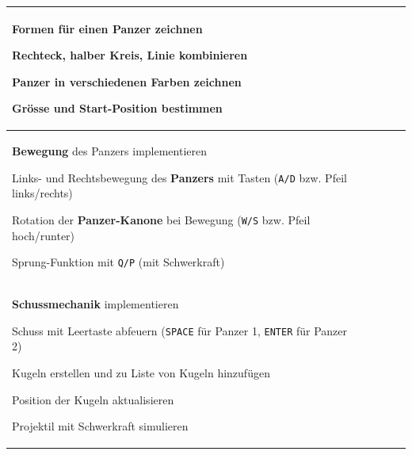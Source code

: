 \begin{landscape}
\begin{longtable}{p{11cm}|p{3cm}|p{3cm}|p{4cm}|p{4cm}}
        \begin{todolist}
            \item \textbf{Formen} für einen Panzer zeichnen
            \begin{todolist}
                \item Rechteck, halber Kreis, Linie kombinieren
                \item Panzer in verschiedenen Farben zeichnen
                \item Grösse und Start-Position bestimmen
            \end{todolist}
        \end{todolist}            &                                        &                                                            &                          &                                                            \\
        \hline
        \begin{todolist}
            \item \textbf{Bewegung} des Panzers implementieren
            \begin{todolist}
                \item Links- und Rechtsbewegung des \textbf{Panzers} mit Tasten (\texttt{A/D} bzw. Pfeil links/rechts)
                \item Rotation der \textbf{Panzer-Kanone} bei Bewegung (\texttt{W/S} bzw. Pfeil hoch/runter)
                \item Sprung-Funktion mit \texttt{Q/P} (mit Schwerkraft)
            \end{todolist}\end{todolist}         &                                        &                                                            &                          &                                      \\
        \hline
        \begin{todolist}
            \item \textbf{Schussmechanik} implementieren
            \begin{todolist}
                \item Schuss mit Leertaste abfeuern (\texttt{SPACE} für Panzer 1, \texttt{ENTER} für Panzer 2)
                \item Kugeln erstellen und zu Liste von Kugeln hinzufügen
                \item Position der Kugeln aktualisieren
                \item Projektil mit Schwerkraft simulieren

\end{todolist}
\end{todolist}
\end{longtable}
\end{landscape}

